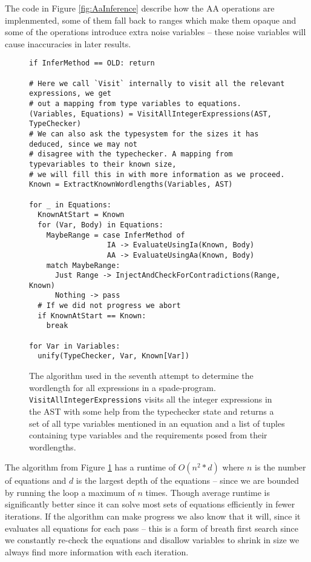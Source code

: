 The code in Figure \ref{fig:AaInference} describe how the AA operations are implenmented, some of them fall back to ranges which make them opaque and some of the operations introduce extra noise variables -- these noise variables will cause inaccuracies in later results.

\begin{figure}
\begin{verbatim}
if InferMethod == OLD: return

# Here we call `Visit` internally to visit all the relevant expressions, we get
# out a mapping from type variables to equations.
(Variables, Equations) = VisitAllIntegerExpressions(AST, TypeChecker)
# We can also ask the typesystem for the sizes it has deduced, since we may not
# disagree with the typechecker. A mapping from typevariables to their known size,
# we will fill this in with more information as we proceed.
Known = ExtractKnownWordlengths(Variables, AST)

for _ in Equations:
  KnownAtStart = Known
  for (Var, Body) in Equations:
    MaybeRange = case InferMethod of
                  IA -> EvaluateUsingIa(Known, Body)
                  AA -> EvaluateUsingAa(Known, Body)
    match MaybeRange:
      Just Range -> InjectAndCheckForContradictions(Range, Known)
      Nothing -> pass
  # If we did not progress we abort
  if KnownAtStart == Known:
    break

for Var in Variables:
  unify(TypeChecker, Var, Known[Var])
\end{verbatim}
  \cprotect\caption{The algorithm used in the seventh attempt to determine the wordlength for all expressions in a spade-program. \verb+VisitAllIntegerExpressions+ visits all the integer expressions in the AST with some help from the typechecker state and returns a set of all type variables mentioned in an equation and a list of tuples containing type variables and the requirements posed from their wordlengths.}
\label{fig:WLIAlgo}
\end{figure}

The algorithm from Figure \ref{fig:WLIAlgo} has a runtime of $O(n^2*d)$ where $n$ is the number of equations and $d$ is the largest depth of the equations -- since we are bounded by running the loop a maximum of $n$ times. Though average runtime is significantly better since it can solve most sets of equations efficiently in fewer iterations. If the algorithm can make progress we also know that it will, since it evaluates all equations for each pass -- this is a form of breath first search since we constantly re-check the equations and disallow variables to shrink in size we always find more information with each iteration.

